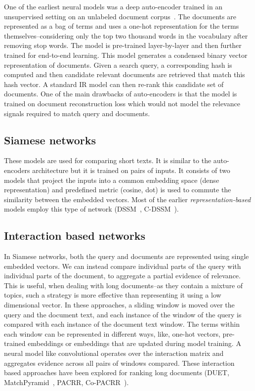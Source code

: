 One of the earliest neural models was a deep auto-encoder trained in an unsupervised setting on an unlabeled document corpus~\citep{SALAKHUTDINOV2009}. The documents are represented as a bag of terms and uses a one-hot representation for the terms themselves--considering only the top two thousand words in the vocabulary after removing stop words. The model is pre-trained layer-by-layer and then further trained for end-to-end learning. This model generates a condensed binary vector representation of documents. Given a search query, a corresponding hash is computed and then candidate relevant documents are retrieved that match this hash vector. A standard IR model can then re-rank this candidate set of documents. One of the main drawbacks of auto-encoders is that the model is trained on document reconstruction loss which would not model the relevance signals required to match query and documents.

\subsection{Siamese networks}
These models are used for comparing short texts. It is similar to the auto-encoders architecture but it is trained on pairs of inputs. It consists of two models that project the inputs into a common embedding space (dense representation) and predefined metric (cosine, dot) is used to commute the similarity between the embedded vectors. Most of the earlier \textit{representation-based} models employ this type of network (DSSM~\citep{dssm13}, C-DSSM~\citep{Shen2014a}).

\subsection{Interaction based networks}
In Siamese networks, both the query and documents are represented using single embedded vectors. We can instead compare individual parts of the query with individual parts of the document, to aggregate a partial evidence of relevance. This is useful, when dealing with long documents--as they contain a mixture of topics, such a strategy is more effective than representing it using a low dimensional vector. In these approaches, a sliding window is moved over the query and the document text, and each instance of the window of the query is compared with each instance of the document text window. The terms within each window can be represented in different ways, like, one-hot vectors, pre-trained embeddings or embeddings that are updated during model training. A neural model like convolutional operates over the interaction matrix and aggregates evidence across all pairs of windows compared. These interaction based approaches have been explored for ranking long documents (DUET, MatchPyramid~\citep{matchpyramid16}, PACRR, Co-PACRR~\citep{pacrr17, co_pacrr_wsdm18}).

